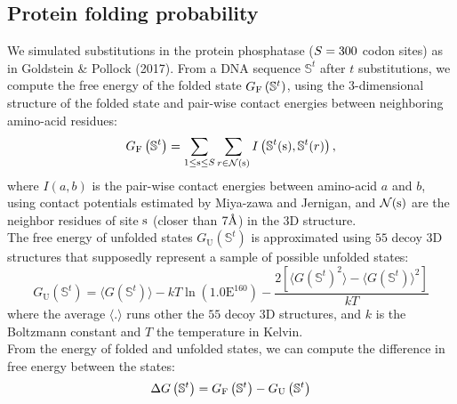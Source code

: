 \subsection{Protein folding probability}
We simulated \glspl{substitution} in the protein phosphatase ($S=300$ \gls{codon} sites) as in Goldstein \& Pollock (2017).
From a \acrshort{DNA} sequence $\mathbb{S}^t$ after $t$ \glspl{substitution}, we compute the free energy of the folded state $G_{\mathrm{F}}\left(\mathbb{S}^{t}\right)$, using the $3$-dimensional structure of the folded state and pair-wise contact energies between neighboring amino-acid residues:
\begin{equation}
    G_{\mathrm{F}}\left(\mathbb{S}^{t}\right) = \sum_{1 \leq \text{s} \leq S} \sum_{r \in \mathcal{N}(\text{s})} I \left(\mathbb{S}^t(\text{s}), \mathbb{S}^t(r) \right),
\end{equation}
where $I(a,b)$ is the pair-wise contact energies between amino-acid $a$ and $b$, using contact potentials estimated by Miya-zawa and Jernigan, and $\mathcal{N}(\text{s})$ are the neighbor residues of site $\text{s}$ (closer than $7\text{\normalfont\AA}$) in the $3$D structure.\\

The free energy of unfolded states $G_{\mathrm{U}}\left(\mathbb{S}^{t}\right)$ is approximated using $55$ decoy $3$D structures that supposedly represent a sample of possible unfolded states:
\begin{equation}
    G_{\mathrm{U}}\left(\mathbb{S}^{t}\right) = \langle G\left(\mathbb{S}^{t}\right) \rangle - kT \ln (1.0\mathrm{E}^{160}) - \dfrac{2 \left[ \langle G\left(\mathbb{S}^{t}\right)^2 \rangle - \langle G\left(\mathbb{S}^{t}\right) \rangle^2\right] }{kT}
\end{equation}
where the average $\langle . \rangle$ runs other the $55$ decoy $3$D structures, and $k$ is the Boltzmann constant and $T$ the temperature in Kelvin.\\

From the energy of folded and unfolded states, we can compute the difference in free energy between the states:
\begin{equation}
    \Delta G\left(\mathbb{S}^{t}\right) = G_{\mathrm{F}}\left(\mathbb{S}^{t}\right) - G_{\mathrm{U}}\left(\mathbb{S}^{t}\right)
\end{equation}

